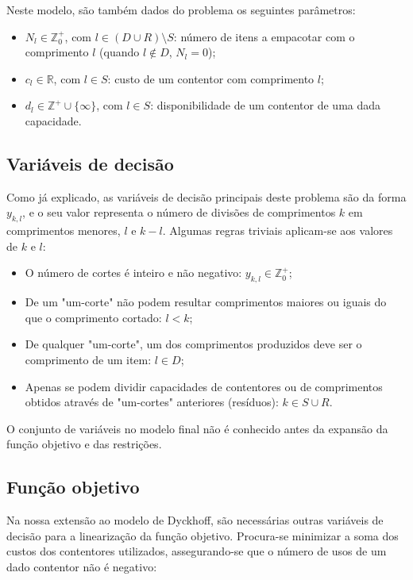 \documentclass[12pt, a4paper, titlepage]{article}
\begin{document}
Neste modelo, são também dados do problema os seguintes parâmetros:

\begin{itemize}
    \item $N_l \in \mathbb{Z}^+_0$, com $l \in (D \cup R) \setminus S$: número de itens a empacotar
        com o comprimento $l$ (quando $l \not \in D$, $N_l = 0$);
    \item $c_l \in \mathbb{R}$, com $l \in S$: custo de um contentor com comprimento $l$;
    \item $d_l \in \mathbb{Z}^+ \cup \{ \infty \}$, com $l \in S$: disponibilidade de um contentor
        de uma dada capacidade.
\end{itemize}

\subsection{Variáveis de decisão}

Como já explicado, as variáveis de decisão principais deste problema são da forma $y_{k, l}$, e o
seu valor representa o número de divisões de comprimentos $k$ em comprimentos menores, $l$ e
$k - l$. Algumas regras triviais aplicam-se aos valores de $k$ e $l$:

\begin{itemize}
    \item O número de cortes é inteiro e não negativo: $y_{k, l} \in \mathbb{Z}^+_0$;
    \item De um "um-corte"{} não podem resultar comprimentos maiores ou iguais do que o comprimento
        cortado: $l < k$;
    \item De qualquer "um-corte"{}, um dos comprimentos produzidos deve ser o comprimento de um
        item: $l \in D$;
    \item Apenas se podem dividir capacidades de contentores ou de comprimentos obtidos através de
        "um-cortes"{} anteriores (resíduos): $k \in S \cup R$.
\end{itemize}

O conjunto de variáveis no modelo final não é conhecido antes da expansão da função objetivo e das
restrições.

\subsection{Função objetivo}

Na nossa extensão ao modelo de Dyckhoff, são necessárias outras variáveis de decisão para a
linearização da função objetivo. Procura-se minimizar a soma dos custos dos contentores utilizados,
assegurando-se que o número de usos de um dado contentor não é negativo:
\end{document}

